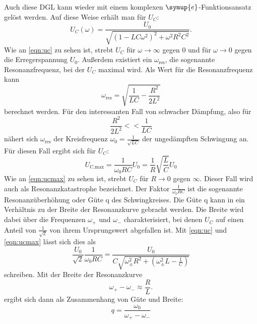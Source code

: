 \documentclass[
  bibliography=totoc,     %
  captions=tableheading,  %
  titlepage=firstiscover, %
]{scrartcl}
\begin{document}
  \noindent Auch diese DGL kann wieder mit einem komplexen $\symup{e}$-Funktionsansatz gelöst werden. Auf diese Weise erhält man für $U_C$:
  \begin{equation}
      U_C(\omega) = \frac{U_0}{\sqrt{(1-LC\omega^2)^2 + \omega^2 R^2 C^2}}.
      \label{eqn:uc}
  \end{equation}
  \noindent Wie an \autoref{eqn:uc} zu sehen ist, strebt $U_C$ für $\omega \to \infty $ gegen 0 und für $\omega \to 0$ gegen die Erregerspannung $U_0$. Außerdem existiert ein $\omega_{\text{res}}$, die sogenannte Resonanzfrequenz, bei der $U_C$ maximal wird. Als Wert für die Resonanzfrequenz kann
  \begin{equation}
      \omega_{\text{res}} = \sqrt{\frac{1}{LC}-\frac{R^2}{2L^2}} 
  \end{equation}
  \noindent berechnet werden. Für den interessanten Fall von schwacher Dämpfung, also für
  \begin{equation*}
      \frac{R^2}{2L^2} << \frac{1}{LC}
  \end{equation*}
  nähert sich $\omega_{\text{res}}$ der Kreisfrequenz $\omega_0=\frac{1}{\sqrt{LC}}$ der ungedämpften Schwingung an. Für diesen Fall ergibt sich für $U_C$:
  \begin{equation}
      U_{\text{C,max}} = \frac{1}{\omega_0 RC} U_0 = \frac{1}{R} \sqrt{\frac{L}{C}} U_0 
      \label{eqn:ucmax}
  \end{equation}
  Wie an \autoref{eqn:ucmax} zu sehen ist, strebt $U_C$ für $R \to 0 $ gegen $\infty$. Dieser Fall wird auch als Resonanzkatastrophe bezeichnet. Der Faktor $\frac{1}{\omega_0 RC}$ ist die sogenannte Resonanzüberhöhung oder Güte q des Schwingkreises.
  \newline
  Die Güte q kann in ein Verhältnis zu der Breite der Resonanzkurve gebracht werden. Die Breite wird dabei über die Frequenzen  $\omega_+$ und $\omega_-$ charakterisiert, bei denen $U_C$ auf einen Anteil von $\frac{1}{\sqrt{2}}$ von ihrem Ursprungswert abgefallen ist. Mit \autoref{eqn:uc} und \autoref{eqn:ucmax} lässt sich dies als
  \begin{equation}
      \frac{U_0}{\sqrt{2}} \frac{1}{\omega_0 RC} = \frac{U_0}{C \sqrt{\omega^2_{\pm} R^2 + ( \omega^2_{\pm}L - \frac{1}{C} ) }}
  \end{equation} 
  schreiben. Mit der Breite der Resonanzkurve
  \begin{equation}
      \omega_+ - \omega_- \approx \frac{R}{L}.
      \label{eqn:breite}
  \end{equation}
  ergibt sich dann als Zusammenhang von Güte und Breite:
  \begin{equation}
      q = \frac{\omega_0}{\omega_+ - \omega_-}
      \label{eqn:guete}
  \end{equation}
  
\end{document}
